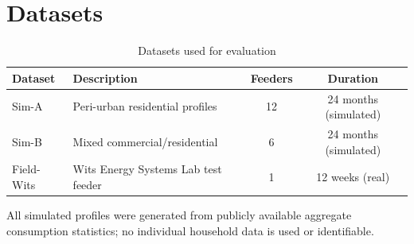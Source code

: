 \section{Datasets}
\begin{table}[htbp]
\centering
\caption{Datasets used for evaluation}
\label{tab:datasets}
\begin{tabularx}{\linewidth}{@{}lXcc@{}}
\toprule
\textbf{Dataset} & \textbf{Description} & \textbf{Feeders} & \textbf{Duration} \\
\midrule
Sim-A & Peri-urban residential profiles & 12 & 24 months (simulated) \\
Sim-B & Mixed commercial/residential & 6 & 24 months (simulated) \\
Field-Wits & Wits Energy Systems Lab test feeder & 1 & 12 weeks (real) \\
\bottomrule
\end{tabularx}
\end{table}

\begin{notebox}
All simulated profiles were generated from publicly available aggregate consumption
statistics; no individual household data is used or identifiable.
\end{notebox}

